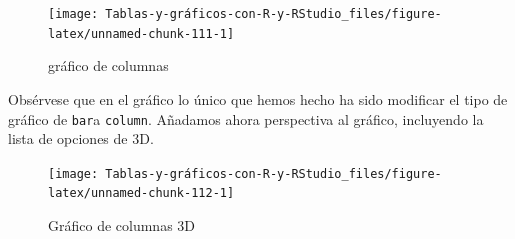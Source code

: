 \documentclass[
]{book}
\newenvironment{Shaded}{\begin{snugshade}}{\end{snugshade}}
\newcommand{\AttributeTok}[1]{\textcolor[rgb]{0.77,0.63,0.00}{#1}}
\newcommand{\ConstantTok}[1]{\textcolor[rgb]{0.00,0.00,0.00}{#1}}
\newcommand{\DecValTok}[1]{\textcolor[rgb]{0.00,0.00,0.81}{#1}}
\newcommand{\FunctionTok}[1]{\textcolor[rgb]{0.00,0.00,0.00}{#1}}
\newcommand{\NormalTok}[1]{#1}
\newcommand{\SpecialCharTok}[1]{\textcolor[rgb]{0.00,0.00,0.00}{#1}}
\newcommand{\StringTok}[1]{\textcolor[rgb]{0.31,0.60,0.02}{#1}}
\begin{document}
\begin{figure}[H]

{\centering \texttt{[image: Tablas-y-gráficos-con-R-y-RStudio\_files/figure-latex/unnamed-chunk-111-1]} 

}

\caption{gráfico de columnas}\label{fig:unnamed-chunk-111}
\end{figure}

Obsérvese que en el gráfico lo único que hemos hecho ha sido modificar el tipo de gráfico de \texttt{bar}a \texttt{column}. Añadamos ahora perspectiva al gráfico, incluyendo la lista de opciones de 3D.

\begin{Shaded}
\end{Shaded}

\begin{figure}[H]

{\centering \texttt{[image: Tablas-y-gráficos-con-R-y-RStudio\_files/figure-latex/unnamed-chunk-112-1]} 

}

\caption{Gráfico de columnas 3D}\label{fig:unnamed-chunk-112}
\end{figure}
\end{document}
